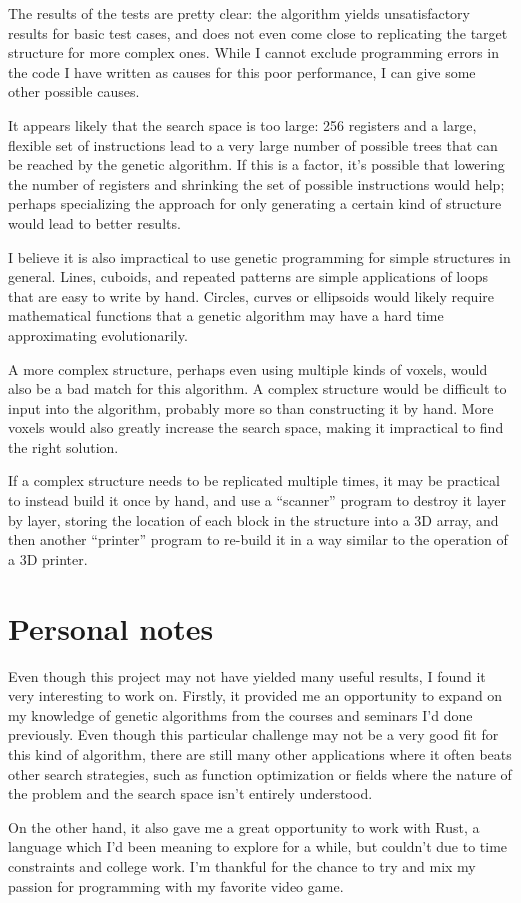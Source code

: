 \documentclass{report}
\begin{document}
The results of the tests are pretty clear: the algorithm yields unsatisfactory results for basic test cases, and does not even come close to replicating the target structure for more complex ones. While I cannot exclude programming errors in the code I have written as causes for this poor performance, I can give some other possible causes. 

It appears likely that the search space is too large: 256 registers and a large, flexible set of instructions lead to a very large number of possible trees that can be reached by the genetic algorithm. If this is a factor, it's possible that lowering the number of registers and shrinking the set of possible instructions would help; perhaps specializing the approach for only generating a certain kind of structure would lead to better results.

I believe it is also impractical to use genetic programming for simple structures in general. Lines, cuboids, and repeated patterns are simple applications of loops that are easy to write by hand. Circles, curves or ellipsoids would likely require mathematical functions that a genetic algorithm may have a hard time approximating evolutionarily.

A more complex structure, perhaps even using multiple kinds of voxels, would also be a bad match for this algorithm. A complex structure would be difficult to input into the algorithm, probably more so than constructing it by hand. More voxels would also greatly increase the search space, making it impractical to find the right solution. 

If a complex structure needs to be replicated multiple times, it may be practical to instead build it once by hand, and use a ``scanner'' program to destroy it layer by layer, storing the location of each block in the structure into a 3D array, and then another ``printer'' program to re-build it in a way similar to the operation of a 3D printer.

\section{Personal notes}

Even though this project may not have yielded many useful results, I found it very interesting to work on. Firstly, it provided me an opportunity to expand on my knowledge of genetic algorithms from the courses and seminars I'd done previously. Even though this particular challenge may not be a very good fit for this kind of algorithm, there are still many other applications where it often beats other search strategies, such as function optimization or fields where the nature of the problem and the search space isn't entirely understood.

On the other hand, it also gave me a great opportunity to work with Rust, a language which I'd been meaning to explore for a while, but couldn't due to time constraints and college work. I'm thankful for the chance to try and mix my passion for programming with my favorite video game.



\end{document}
